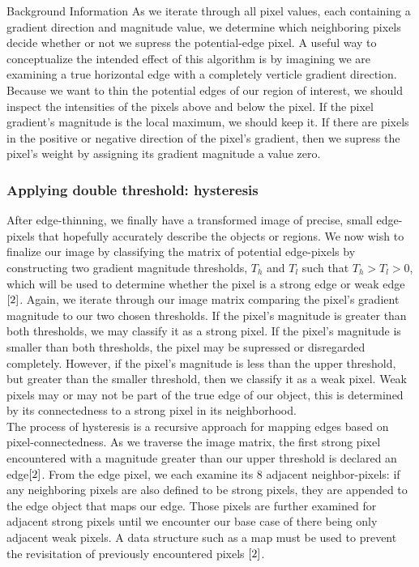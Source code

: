 \documentclass[a4paper,12pt]{article}
\begin{document}
\begin{section}{Background Information}
As we iterate through all pixel values, each containing a gradient direction and magnitude value, we determine which neighboring pixels decide whether or not we supress the potential-edge pixel.
A useful way to conceptualize the intended effect of this algorithm is by imagining we are examining a true horizontal edge with a completely verticle gradient direction.
Because we want to thin the potential edges of our region of interest, we should inspect the intensities of the pixels above and below the pixel.
If the pixel gradient's magnitude is the local maximum, we should keep it. 
If there are pixels in the positive or negative direction of the pixel's gradient, then we supress the pixel's weight by assigning its gradient magnitude a value zero.

\subsubsection{Applying double threshold: hysteresis}

After edge-thinning, we finally have a transformed image of precise, small edge-pixels that hopefully accurately describe the objects or regions.
We now wish to finalize our image by classifying the matrix of potential edge-pixels by constructing two gradient magnitude thresholds, $T_h$ and $T_l$ such that $T_h$$>$$T_l$$>$$0$, which will be used to determine whether the pixel is a strong edge or weak edge$\cite{2}$.%
Again, we iterate through our image matrix comparing the pixel's gradient magnitude to our two chosen thresholds.
If the pixel's magnitude is greater than both thresholds, we may classify it as a strong pixel.
If the pixel's magnitude is smaller than both thresholds, the pixel may be supressed or disregarded completely.
However, if the pixel's magnitude is less than the upper threshold, but greater than the smaller threshold, then we classify it as a weak pixel.
Weak pixels may or may not be part of the true edge of our object, this is determined by its connectedness to a strong pixel in its neighborhood.\\

The process of hysteresis is a recursive approach for mapping edges based on pixel-connectedness. As we traverse the image matrix, the first strong pixel encountered with a magnitude greater than our upper threshold is declared an edge$\cite{2}$.%
From the edge pixel, we each examine its 8 adjacent neighbor-pixels: if any neighboring pixels are also defined to be strong pixels, they are appended to the edge object that maps our edge.
Those pixels are further examined for adjacent strong pixels until we encounter our base case of there being only adjacent weak pixels.
A data structure such as a map must be used to prevent the revisitation of previously encountered pixels $\cite{2}$.


\end{section}
\end{document}
